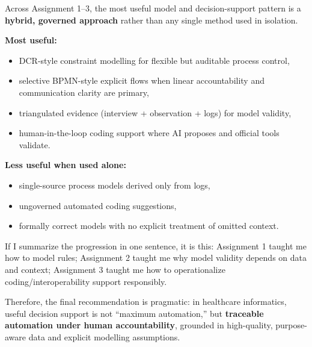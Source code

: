 Across Assignment 1--3, the most useful model and decision-support pattern is a \textbf{hybrid, governed approach} rather than any single method used in isolation.

\textbf{Most useful:}
\begin{itemize}
    \item DCR-style constraint modelling for flexible but auditable process control,
    \item selective BPMN-style explicit flows when linear accountability and communication clarity are primary,
    \item triangulated evidence (interview + observation + logs) for model validity,
    \item human-in-the-loop coding support where AI proposes and official tools validate.
\end{itemize}

\textbf{Less useful when used alone:}
\begin{itemize}
    \item single-source process models derived only from logs,
    \item ungoverned automated coding suggestions,
    \item formally correct models with no explicit treatment of omitted context.
\end{itemize}

If I summarize the progression in one sentence, it is this: Assignment 1 taught me how to model rules; Assignment 2 taught me why model validity depends on data and context; Assignment 3 taught me how to operationalize coding/interoperability support responsibly.

Therefore, the final recommendation is pragmatic: in healthcare informatics, useful decision support is not ``maximum automation,'' but \textbf{traceable automation under human accountability}, grounded in high-quality, purpose-aware data and explicit modelling assumptions.
